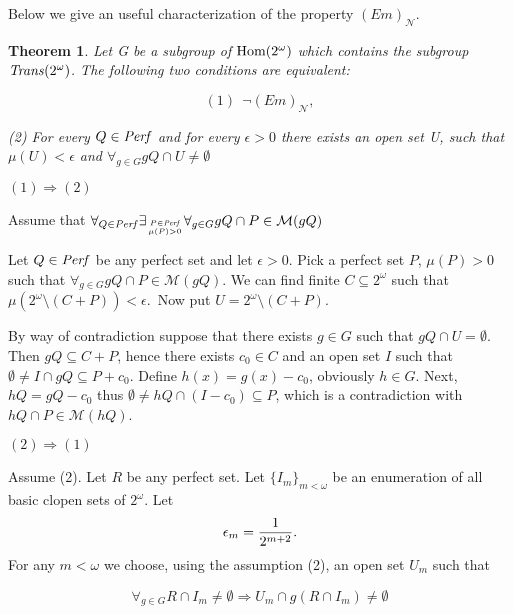 \documentclass[b5cutpaper, twoside, 11pt, leqno]{moravica}
\newcommand{\eps}{\epsilon}
\newcommand\trans{{\it Trans}(\ca)}
\newcommand\ooo{\underline{O}}
\newcommand{\seq}{\subseteq}
\newcommand{\ca}{2^{\omega}}
\newcommand{\mgr}{{\mathcal M}}
\newcommand{\neglig}{{\mathcal N}}
\newcommand{\perf}{{\it Perf}}
\newcommand{\cantor}{\ca}
\newcommand\Hom{{\rm Hom(\ca)}}
\newtheorem{theorem}{Theorem}[section]
\theoremstyle{definition}
\begin{document}
 
  Below we give an useful characterization of the
property $(Em)_{\neglig}$.

\medskip

\begin{theorem}
Let G be a subgroup of $\Hom$ which contains the
subgroup $\trans$. The following two conditions are
equivalent:

\[ (1)\ \ \neg (Em)_{\neglig}, \]

\par (2) For every $Q \in \perf$
and for every $\eps > 0$ there exists an open
set U, such that
$\mu(U) < \eps$
and $\forall_{g \in G} gQ \cap U \not = \emptyset$
\end{theorem}

\proof

$(1) \Rightarrow (2)$
\par
Assume that
$\forall_{Q \in \perf} \exists_{P \in \perf \atop \mu(P) > 0}
\forall_{g \in G} gQ \cap P \in \mgr(gQ)$

Let $Q \in \perf$ be any perfect set and let $\eps > 0$.
Pick a perfect set $P$, $\mu(P) > 0$ such
that $\forall_{g \in G} gQ \cap P \in \mgr(gQ)$.
We can find finite $C \seq \cantor$ such that
$\mu(\cantor \setminus (C+P)) < \eps$.\
Now put $U = \cantor \setminus (C+P)$.

By way of contradiction suppose that
there exists $g \in G$ such that
$gQ \cap U = \emptyset$.
Then $gQ \seq C + P$, hence
there exists $c_0 \in C$ and an open set $I$
such that $\emptyset \not = I \cap gQ \seq P + c_0$.
  Define $h(x) = g(x) - c_0$, obviously $h \in G$.
Next, $hQ = gQ - c_0$ thus
$\emptyset \not = hQ \cap (I - c_0) \seq P$,
which is a contradiction with
$hQ \cap P \in \mgr(hQ)$.


\medskip

$(2) \Rightarrow (1)$

Assume (2). Let $R$ be any perfect
set. Let $\{ I_m \} _{m < \omega}$
be an enumeration of all basic clopen sets of $\cantor$.
Let
  \[\eps_{m} = {1 \over 2^{m + 2}}.\]
For any $m < \omega$
we choose, using the assumption (2),
an open set $U_{m}$ such that

\[
\forall_{g\in G} R \cap I_m \not = \emptyset
\Rightarrow U_{m} \cap g(R \cap I_m) \not = \emptyset
\]
\end{document}
